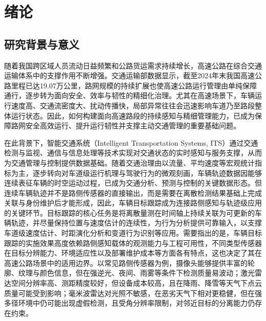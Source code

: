 \documentclass{xdupgthesis}
\begin{document}
\chapter{绪论}

\section{研究背景与意义}

随着我国跨区域人员流动日益频繁和公路货运需求持续增长，高速公路在综合交通运输体系中的支撑作用不断增强。交通运输部数据显示，截至2024年末我国高速公路里程已达19.07万公里\cite{mot2024statisticalbulletin}，路网规模的持续扩展也使高速公路运行管理由单纯保障通行，逐步转为面向安全、效率与韧性的精细化治理。尤其在高速场景下，车辆运行速度高、交通流密度大、扰动传播快，局部异常往往会迅速影响车道乃至路段整体运行状态。因此，如何构建面向高速路段的持续感知与精细管理能力，已成为保障路网安全高效运行、提升运行韧性并支撑主动交通管理的重要基础问题。

在此背景下，智能交通系统（Intelligent Transportation Systems, ITS）通过交通检测与监视、通信与信息处理等技术实现对交通状态的实时感知与服务支撑，从而为交通管理与控制提供数据基础\cite{mimbela2007vdstits}。随着交通治理由以流量、平均速度等宏观统计指标为主，逐步转向对车道级运行机理与驾驶行为的微观刻画，车辆轨迹数据因能够连续表征车辆的时空运动过程，已成为交通分析、预测与控制的关键数据形态\cite{liu2025trajectorysurvey}。但连续车辆轨迹并不是路侧传感器的直接输出，而是需要在离散检测结果基础上完成关联与身份维护后才能形成，因此，车辆目标跟踪成为连接路侧感知与轨迹级应用的关键环节。目标跟踪的核心任务是将离散量测在时间轴上持续关联为可更新的车辆轨迹，并尽量保持位置与速度估计的连续性，为行为分析提供可靠输入，以支撑车道级速度估计、时距演化分析和变道行为识别等应用。需要指出的是，车辆目标跟踪的实施效果高度依赖路侧感知载体的观测能力与工程可用性，不同类型传感器在目标分辨能力、环境适应性以及部署维护成本等方面各有特点，这也决定了其在高速公路场景中的适用边界。以常见路侧传感器为例，摄像头能够提供丰富的轮廓、纹理与颜色信息，但在强逆光、夜间、雨雾等条件下检测质量易波动\cite{Pandharipande2023Perception}；激光雷达空间分辨率高、测距精度较好，但设备成本较高，且在降雨、降雪等天气下点云质量可能受到影响\cite{Pandharipande2023Perception,Wu2025LiDARAdverseWeather}；毫米波雷达对光照不敏感，在恶劣天气下相对更稳健，但在强多径环境中仍可能出现虚假检测，且受角分辨率限制，对邻近目标的分离能力仍存在约束\cite{Kong2025mmWaveSurvey}。
\end{document}
